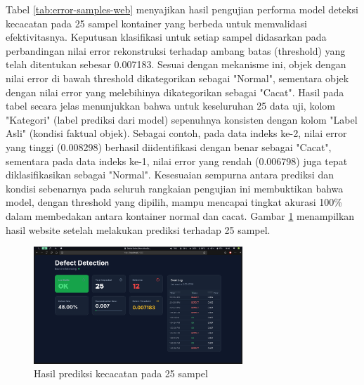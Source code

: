 Tabel \ref{tab:error-samples-web} menyajikan hasil pengujian
performa model deteksi kecacatan pada 25 sampel kontainer yang
berbeda untuk memvalidasi efektivitasnya. Keputusan klasifikasi untuk
setiap sampel didasarkan pada perbandingan nilai error rekonstruksi
terhadap ambang batas (threshold) yang telah ditentukan sebesar
0.007183. Sesuai dengan mekanisme ini, objek dengan nilai error di
bawah threshold dikategorikan sebagai "Normal", sementara objek
dengan nilai error yang melebihinya dikategorikan sebagai "Cacat".
Hasil pada tabel secara jelas menunjukkan bahwa untuk keseluruhan 25
data uji, kolom "Kategori" (label prediksi dari model) sepenuhnya
konsisten dengan kolom "Label Asli" (kondisi faktual objek). Sebagai
contoh, pada data indeks ke-2, nilai error yang tinggi (0.008298)
berhasil diidentifikasi dengan benar sebagai "Cacat", sementara pada
data indeks ke-1, nilai error yang rendah (0.006798) juga tepat
diklasifikasikan sebagai "Normal". Kesesuaian sempurna antara
prediksi dan kondisi sebenarnya pada seluruh rangkaian pengujian ini
membuktikan bahwa model, dengan threshold yang dipilih, mampu
mencapai tingkat akurasi 100\% dalam membedakan antara kontainer
normal dan cacat. Gambar \ref{fig:web-25} menampilkan hasil website
setelah melakukan prediksi terhadap 25 sampel.

\begin{figure}[H]
  \centering
  \includegraphics[width=0.7\textwidth]{gambar/ss_web_25.png}
  \caption{Hasil prediksi kecacatan pada 25 sampel}
  \label{fig:web-25}
\end{figure}
\vspace{-1em}
